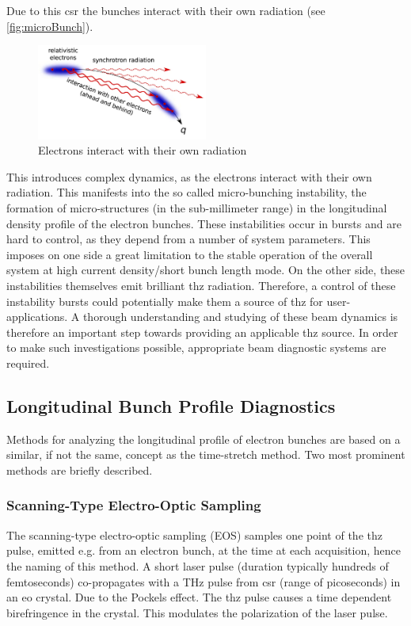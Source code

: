 Due to this \gls{csr} the bunches interact with their own radiation (see \autoref{fig:microBunch}).

\begin{figure}[tbh]
	\centering
	\includegraphics[width = 0.5\textwidth]{chap/02-theory/img/microbunching}
	\caption{Electrons interact with their own radiation \cite{Bielawski2019}}
	\label{fig:microBunch}
\end{figure}
This introduces complex dynamics, as the electrons interact with their own radiation.
This manifests into the so called micro-bunching instability, the formation of micro-structures (in the sub-millimeter range) in the longitudinal density profile of the electron bunches.
These instabilities occur in bursts and are hard to control, as they depend from a number of system parameters.
This imposes on one side a great limitation to the stable operation of the overall system at high current density/short bunch length mode.
On the other side, these instabilities themselves emit brilliant \gls{thz} radiation. 
Therefore, a control of these instability bursts could potentially make them a source of \gls{thz} for user-applications. 
A thorough understanding and studying of these beam dynamics is therefore an important step towards providing an applicable \gls{thz} source. \cite{rota2018,brosi}
In order to make such investigations possible, appropriate beam diagnostic systems are required. 



\subsection*{Longitudinal Bunch Profile Diagnostics}
Methods for analyzing the longitudinal profile of electron bunches are based on a similar, if not the same, concept as the time-stretch method. 
Two most prominent methods are briefly described.
\subsubsection*{Scanning-Type Electro-Optic Sampling}
The scanning-type electro-optic sampling (EOS) samples one point of the \gls{thz} pulse, emitted e.g. from an electron bunch, at the time at each acquisition, hence the naming of this method.
A short laser pulse (duration typically hundreds of femtoseconds) co-propagates with a THz pulse from \gls{csr} (range of picoseconds) in an \gls{eo} crystal. Due to the Pockels effect. The \gls{thz} pulse causes a time dependent birefringence in the crystal.
This modulates the polarization of the laser pulse.

